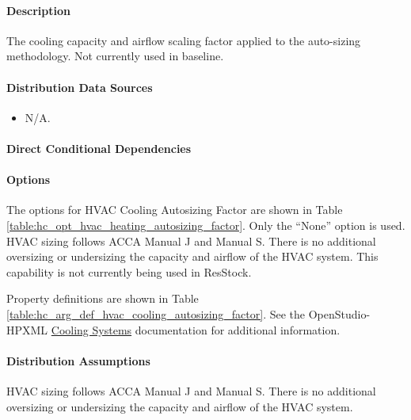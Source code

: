 \paragraph{Description}
% 
The cooling capacity and airflow scaling factor applied to the auto-sizing methodology. Not currently used in baseline. 

\paragraph{Distribution Data Sources}
% 
\begin{itemize}
\item N/A.
\end{itemize}

\paragraph{Direct Conditional Dependencies}


\paragraph{Options}
The options for HVAC Cooling Autosizing Factor are shown in Table \ref{table:hc_opt_hvac_heating_autosizing_factor}. Only the ``None'' option is used. HVAC sizing follows ACCA Manual J and Manual S. There is no additional oversizing or undersizing the capacity and airflow of the HVAC system. This capability is not currently being used in ResStock.



Property definitions are shown in Table \ref{table:hc_arg_def_hvac_cooling_autosizing_factor}. See the OpenStudio-HPXML \href{https://openstudio-hpxml.readthedocs.io/en/v1.10.0/workflow_inputs.html#hpxml-cooling-systems}{Cooling Systems} documentation for additional information.



\paragraph{Distribution Assumptions}
% 
HVAC sizing follows ACCA Manual J and Manual S. There is no additional oversizing or undersizing the capacity and airflow of the HVAC system. 
